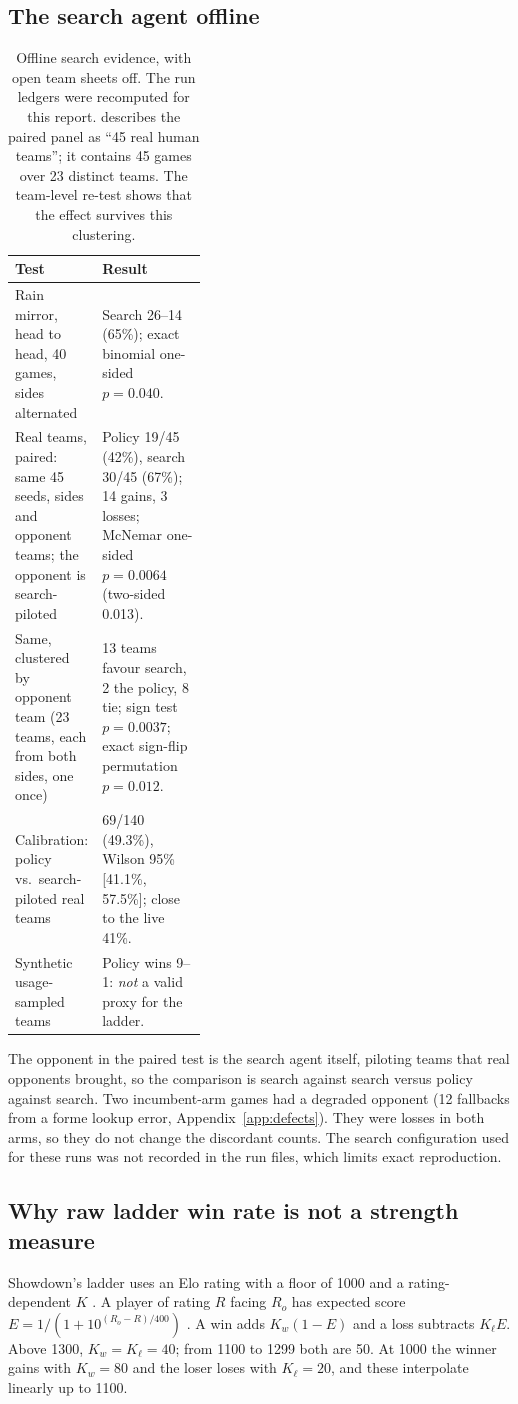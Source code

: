 \subsection{The search agent offline}
\begin{table}[htbp]
\centering\small
\begin{tabularx}{\linewidth}{>{\raggedright\arraybackslash}p{0.38\linewidth} X}
\toprule
Test & Result \\
\midrule
Rain mirror, head to head, 40 games, sides alternated & Search 26--14 (65\%);
exact binomial one-sided $p=0.040$. \\
Real teams, paired: same 45 seeds, sides and opponent teams; the
opponent is search-piloted & Policy 19/45 (42\%), search 30/45 (67\%); 14
gains, 3 losses; McNemar one-sided $p=0.0064$ (two-sided 0.013). \\
Same, clustered by opponent team (23 teams, each from both sides, one once) &
13 teams favour search, 2 the policy, 8 tie; sign test $p=0.0037$; exact
sign-flip permutation $p=0.012$. \\
Calibration: policy vs.\ search-piloted real teams & 69/140 (49.3\%), Wilson
95\% [41.1\%, 57.5\%]; close to the live 41\%. \\
Synthetic usage-sampled teams & Policy wins 9--1: \emph{not} a valid proxy for
the ladder. \\
\bottomrule
\end{tabularx}
\caption{Offline search evidence, with open team sheets off. The run ledgers
were recomputed for this report.  describes the
paired panel as ``45 real human teams''; it contains 45 games over 23 distinct
teams. The team-level re-test shows that the effect survives this
clustering.}
\label{tab:searchoffline}
\end{table}

The opponent in the paired test is the search agent itself, piloting teams
that real opponents brought, so the comparison is search against search
versus policy against search. Two incumbent-arm games had a degraded opponent
(12 fallbacks from a forme lookup error, Appendix~\ref{app:defects}). They
were losses in both arms, so they do not change the discordant counts. The
search configuration used for these runs was not recorded in the run files,
which limits exact reproduction.

\subsection{Why raw ladder win rate is not a strength measure}
\label{sec:elo}
Showdown's ladder uses an Elo rating with a floor of 1000 and a rating-dependent
$K$ \citep{showdownladder}. A player of rating $R$ facing $R_o$ has expected
score $E=1/(1+10^{(R_o-R)/400})$ \citep{elo}. A win adds $K_w(1-E)$ and a loss
subtracts $K_\ell E$. Above 1300, $K_w=K_\ell=40$; from 1100 to 1299 both are 50.
At 1000 the winner gains with $K_w=80$ and the loser loses with $K_\ell=20$,
and these interpolate linearly up to 1100.

